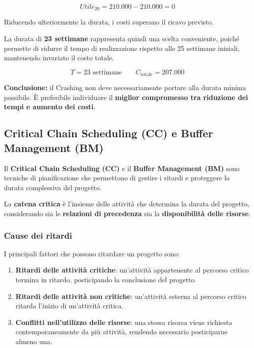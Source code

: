 \[
Utile_{20}=210.000-210.000=\boxed{0}
\]

\noindent Riducendo ulteriormente la durata,
i costi superano il ricavo previsto.

\medskip

\noindent La durata di \textbf{23 settimane} rappresenta
quindi una scelta conveniente, poiché permette
di ridurre il tempo di realizzazione rispetto
alle 25 settimane iniziali, mantenendo invariato
il costo totale.

\[
\boxed{
T=23\text{ settimane}
\qquad
C_{\text{totale}}=207.000
}
\]

\noindent \textbf{Conclusione:} il Crashing non deve
necessariamente portare alla durata minima possibile.
È preferibile individuare il \textbf{miglior compromesso
tra riduzione dei tempi e aumento dei costi}.

\subsection{Critical Chain Scheduling (CC) e Buffer Management (BM)}

\noindent Il \textbf{Critical Chain Scheduling (CC)} e il \textbf{Buffer Management (BM)} sono tecniche di pianificazione che permettono di gestire i ritardi e proteggere la durata complessiva del progetto.

\medskip

\noindent La \textbf{catena critica} è l'insieme delle attività che determina la durata del progetto, considerando sia le \textbf{relazioni di precedenza} sia la \textbf{disponibilità delle risorse}.

\subsubsection*{Cause dei ritardi}

\noindent I principali fattori che possono ritardare un progetto sono:

\begin{enumerate}
    \item \textbf{Ritardi delle attività critiche}: un'attività appartenente al percorso critico termina in ritardo, posticipando la conclusione del progetto.

    \item \textbf{Ritardi delle attività non critiche}: un'attività esterna al percorso critico ritarda l'inizio di un'attività critica.

    \item \textbf{Conflitti nell'utilizzo delle risorse}: una stessa risorsa viene richiesta contemporaneamente da più attività, rendendo necessario posticiparne almeno una.
\end{enumerate}

